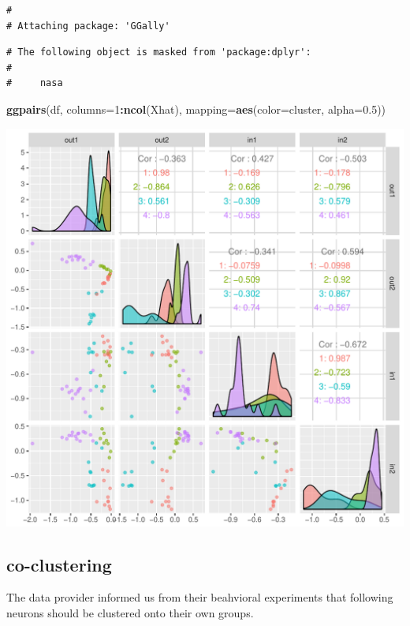 \documentclass[]{article}
\newenvironment{Shaded}{\begin{snugshade}}{\end{snugshade}}
\newcommand{\KeywordTok}[1]{\textcolor[rgb]{0.13,0.29,0.53}{\textbf{#1}}}
\newcommand{\DataTypeTok}[1]{\textcolor[rgb]{0.13,0.29,0.53}{#1}}
\newcommand{\DecValTok}[1]{\textcolor[rgb]{0.00,0.00,0.81}{#1}}
\newcommand{\FloatTok}[1]{\textcolor[rgb]{0.00,0.00,0.81}{#1}}
\newcommand{\OperatorTok}[1]{\textcolor[rgb]{0.81,0.36,0.00}{\textbf{#1}}}
\newcommand{\NormalTok}[1]{#1}
\begin{document}
\begin{verbatim}
# 
# Attaching package: 'GGally'
\end{verbatim}

\begin{verbatim}
# The following object is masked from 'package:dplyr':
# 
#     nasa
\end{verbatim}

\begin{Shaded}
\begin{Highlighting}[]
\KeywordTok{ggpairs}\NormalTok{(df, }\DataTypeTok{columns=}\DecValTok{1}\OperatorTok{:}\KeywordTok{ncol}\NormalTok{(Xhat), }\DataTypeTok{mapping=}\KeywordTok{aes}\NormalTok{(}\DataTypeTok{color=}\NormalTok{cluster, }\DataTypeTok{alpha=}\FloatTok{0.5}\NormalTok{))}
\end{Highlighting}
\end{Shaded}

\includegraphics{gmmase_files/figure-latex/post-1.pdf}

\subsection{co-clustering}\label{co-clustering}

The data provider informed us from their beahvioral experiments that
following neurons should be clustered onto their own groups.
\end{document}
